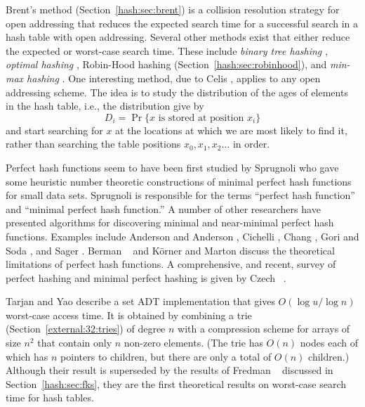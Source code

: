 Brent's method (Section~\ref{hash:sec:brent}) is a collision
resolution strategy for open addressing that reduces the expected
search time for a successful search in a hash table with open
addressing.  Several other methods exist that either reduce the
expected or worst-case search time.  These include \emph{binary tree
hashing}
\cite{m77, gm79}, \emph{optimal
hashing}
\cite{p76,r78,gm79}, Robin-Hood hashing
(Section~\ref{hash:sec:robinhood}), and \emph{min-max
hashing} \cite{g81,c86}.
One interesting method, due to Celis \cite{c86}, applies to any open
addressing scheme.  The idea is to study the distribution of the ages
of elements in the hash table, i.e., the distribution give by 
\[
    D_i=\Pr\{\mbox{$x$ is stored at position $x_i$}\} 
\] 
and start searching for $x$ at the locations at which we are most
likely to find it, rather than searching the table positions
$x_0,x_1,x_2\ldots$ in order.

Perfect hash functions seem to have been first studied by Sprugnoli
\cite{s77} who gave some heuristic number theoretic constructions of
minimal perfect hash functions for small data sets.  Sprugnoli is
responsible for the terms ``perfect hash function'' and ``minimal
perfect hash function.''  A number of other researchers have presented
algorithms for discovering minimal and near-minimal perfect hash
functions.  Examples include Anderson and Anderson \cite{aa79},
Cichelli \cite{c80a,c80b}, Chang \cite{c84a,c84b}, Gori and Soda
\cite{gs89}, and Sager \cite{s85}.  Berman \etal\ \cite{bbdo86} and
K\"orner and Marton \cite{km88} discuss the theoretical limitations of
perfect hash functions.  A comprehensive, and recent, survey of
perfect hashing and minimal perfect hashing is given by Czech \etal\
\cite{chm97}.

Tarjan and Yao \cite{ty79} describe a set ADT implementation that
gives $O(\log u/\log n)$ worst-case access time.  It is obtained by
combining a trie (Section~\ref{external:32:tries}) of degree $n$ with a
compression scheme for arrays of size $n^2$ that contain only $n$
non-zero elements.  (The trie has $O(n)$ nodes each of which has $n$
pointers to children, but there are only a total of $O(n)$ children.)
Although their result is superseded by the results of Fredman \etal\
\cite{fks84} discussed in Section~\ref{hash:sec:fks}, they are the
first theoretical results on worst-case search time for hash tables.

